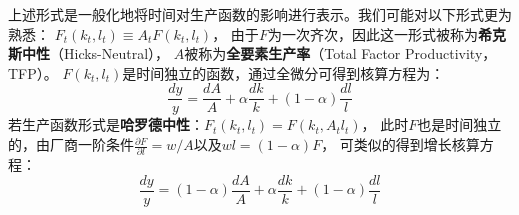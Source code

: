 上述形式是一般化地将时间对生产函数的影响进行表示。我们可能对以下形式更为熟悉：
$F_t\left(k_t, l_t\right) \equiv A_tF\left(k_t, l_t\right)$，
由于$F$为一次齐次，因此这一形式被称为\textbf{希克斯中性}（Hicks-Neutral），
$A$被称为\textbf{全要素生产率}（Total Factor Productivity，TFP）。
$F\left(k_t,l_t\right)$是时间独立的函数，通过全微分可得到核算方程为：
\begin{equation}
    \frac{d y}{y}=\frac{d A}{A}+\alpha \frac{d k}{k}+(1-\alpha) \frac{d l}{l}
\end{equation}
若生产函数形式是\textbf{哈罗德中性}：$F_t\left(k_t, l_t\right) = F\left(k_t, A_tl_t\right)$，
此时$F$也是时间独立的，由厂商一阶条件$\frac{\partial F}{\partial l}=w/A$以及$wl=(1-\alpha)F$，
可类似的得到增长核算方程：
\begin{equation}
    \frac{d y}{y}=(1-\alpha) \frac{d A}{A}+\alpha \frac{d k}{k}+(1-\alpha) \frac{d l}{l}
\end{equation}
